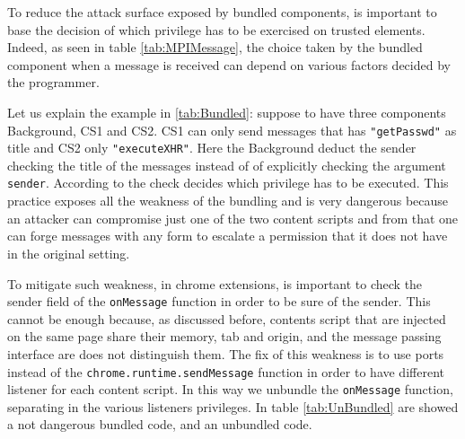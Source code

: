 To reduce the attack surface exposed by bundled components, is important to base the decision of which privilege has to be exercised on trusted elements. Indeed, as seen in table \ref{tab:MPIMessage}, the choice taken by the bundled component when a message is received can depend on various factors decided by the programmer.

Let us explain the example in \ref{tab:Bundled}: suppose to have three components Background, CS1 and CS2. CS1 can only send messages that has \texttt{"getPasswd"} as title and CS2 only \texttt{"executeXHR"}. Here the Background deduct the sender checking the title of the messages instead of of explicitly checking the argument \texttt{sender}. According to the check decides which privilege has to be executed. This practice exposes all the weakness of the bundling and is very dangerous because an attacker can compromise just one of the two content scripts and from that one can forge messages with any form to escalate a permission that it does not have in the original setting.

To mitigate such weakness, in chrome extensions, is important to check the sender field of the \texttt{onMessage} function in order to be sure of the sender. This cannot be enough because, as discussed before, contents script that are injected on the same page share their memory, tab and origin, and the message passing interface are does not distinguish them. The fix of this weakness is to use ports instead of the \texttt{chrome.runtime.sendMessage} function in order to have different listener for each content script. In this way we unbundle the \texttt{onMessage} function, separating in the various listeners privileges. In table \ref{tab:UnBundled} are showed a not dangerous bundled code, and an unbundled code.

